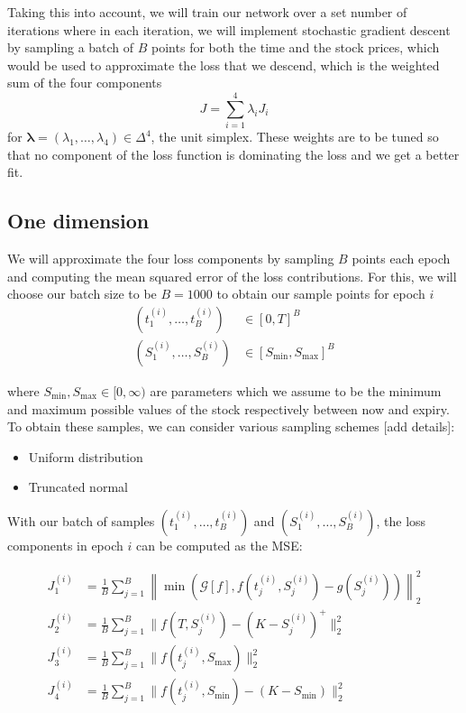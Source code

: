 Taking this into account, we will train our network over a set number of iterations where in each iteration, we will implement stochastic gradient descent by sampling a batch of $B$ points for both the time and the stock prices, which would be used to approximate the loss that we descend, which is the weighted sum of the four components
\[J = \sum_{i=1}^4 \lambda_iJ_i\]
for $\bm \lambda = (\lambda_1, \dots, \lambda_4) \in \Delta^4$, the unit simplex. These weights are to be tuned so that no component of the loss function is dominating the loss and we get a better fit.

\subsection{One dimension}

We will approximate the four loss components by sampling $B$ points each epoch and computing the mean squared error of the loss contributions. For this, we will choose our batch size to be $B=1000$ to obtain our sample points for epoch $i$
\begin{align*}
    (t_1^{(i)}, \dots, t_B^{(i)}) &\in [0, T]^B\\
    (S_1^{(i)}, \dots, S_B^{(i)}) &\in [S_\text{min}, S_\text{max}]^B
\end{align*}

where $S_\text{min}, S_\text{max} \in [0, \infty)$ are parameters which we assume to be the minimum and maximum possible values of the stock respectively between now and expiry. To obtain these samples, we can consider various sampling schemes [add details]:

\begin{itemize}
    \item Uniform distribution
    \item Truncated normal
\end{itemize}

With our batch of samples $(t_1^{(i)}, \dots, t_B^{(i)})$ and $(S_1^{(i)}, \dots, S_B^{(i)})$, the loss components in epoch $i$ can be computed as the MSE:

\begin{align*}
J_1^{(i)} &= \frac 1B\sum_{j=1}^B\left\|
\min\left(\mathcal G[f], f(t_j^{(i)}, S_j^{(i)}) - g(S_j^{(i)})\right)
\right\|^2_2 \\
J_2^{(i)} &= \frac 1B\sum_{j=1}^B \| f(T, S_j^{(i)}) - (K-S_j^{(i)})^+\|^2_2\\
J_3^{(i)} &= \frac 1B\sum_{j=1}^B \|f(t_j^{(i)}, S_\text{max}) \|^2_2\\
J_4^{(i)} &= \frac 1B\sum_{j=1}^B \| f(t_j^{(i)}, S_\text{min}) - (K-S_\text{min})\|^2_2\\
\end{align*}

